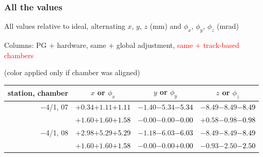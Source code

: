 \documentclass[compress]{beamer}
\begin{document}
\begin{frame}
\frametitle{All the values}
\tiny

All values relative to ideal, alternating $x$, $y$, $z$ (mm) and $\phi_x$, $\phi_y$, $\phi_z$ (mrad)

Columns: PG $+$ hardware, same $+$ global adjustment, \textcolor{red}{same $+$ track-based chambers}

\hfill (color applied only if chamber was aligned)

\vfill
\renewcommand{\arraystretch}{1.1}
\begin{tabular}{r | c | c | c}
station, chamber & $x$ or $\phi_x$ & $y$ or $\phi_y$ & $z$ or $\phi_z$ \\\hline
$-$4/1, 07 & $+0.34$\hspace{0.1 cm}$+1.11$\hspace{0.1 cm}\textcolor{black}{$+1.11$} & $-1.40$\hspace{0.1 cm}$-5.34$\hspace{0.1 cm}\textcolor{black}{$-5.34$} & $-8.49$\hspace{0.1 cm}$-8.49$\hspace{0.1 cm}\textcolor{black}{$-8.49$} \\
           & $+1.60$\hspace{0.1 cm}$+1.60$\hspace{0.1 cm}\textcolor{black}{$+1.58$} & $-0.00$\hspace{0.1 cm}$-0.00$\hspace{0.1 cm}\textcolor{black}{$-0.00$} & $+0.58$\hspace{0.1 cm}$-0.98$\hspace{0.1 cm}\textcolor{black}{$-0.98$} \\
$-$4/1, 08 & $+2.98$\hspace{0.1 cm}$+5.29$\hspace{0.1 cm}\textcolor{black}{$+5.29$} & $-1.18$\hspace{0.1 cm}$-6.03$\hspace{0.1 cm}\textcolor{black}{$-6.03$} & $-8.49$\hspace{0.1 cm}$-8.49$\hspace{0.1 cm}\textcolor{black}{$-8.49$} \\
           & $+1.60$\hspace{0.1 cm}$+1.60$\hspace{0.1 cm}\textcolor{black}{$+1.58$} & $-0.00$\hspace{0.1 cm}$-0.00$\hspace{0.1 cm}\textcolor{black}{$+0.00$} & $-0.93$\hspace{0.1 cm}$-2.50$\hspace{0.1 cm}\textcolor{black}{$-2.50$} \\

\end{tabular}
\end{frame}
\end{document}
